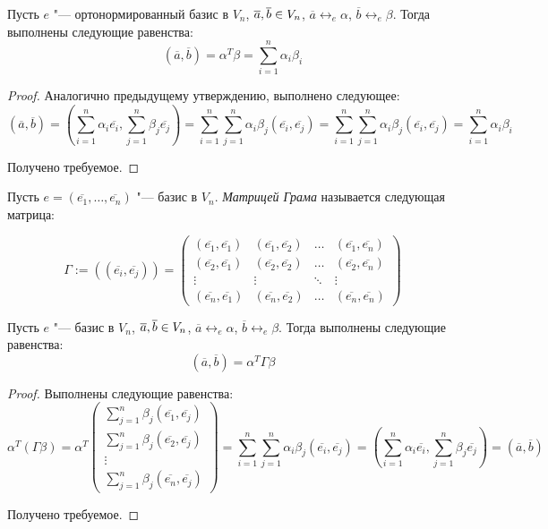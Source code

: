 \begin{proposition}
	Пусть $e$ "--- ортонормированный базис в $V_n$, $\overline{a}, \overline{b} \hm{\in} V_n$, $\overline{a} \leftrightarrow_{e} \alpha$, $\overline{b} \leftrightarrow_{e} \beta$. Тогда выполнены следующие равенства:
	\[(\overline{a}, \overline{b}) = \alpha^T\beta = \sum_{i = 1}^{n}\alpha_i\beta_i\]
\end{proposition}

\begin{proof}
	Аналогично предыдущему утверждению, выполнено следующее:
	\[(\overline{a}, \overline{b}) = \left(\sum_{i = 1}^{n}\alpha_i\overline{e_i}, \sum_{j = 1}^{n}\beta_j\overline{e_j}\right) = \sum_{i = 1}^{n}\sum_{j = 1}^{n}\alpha_i\beta_j(\overline{e_i}, \overline{e_j}) = \sum_{i = 1}^{n}\sum_{j = 1}^{n}\alpha_i\beta_j(\overline{e_i}, \overline{e_j}) = \sum_{i = 1}^{n}\alpha_i\beta_i\]
	
	Получено требуемое.
\end{proof}

\begin{definition}
	Пусть $e = (\overline{e_1}, \dots, \overline{e_n})$ "--- базис в $V_n$. \textit{Матрицей Грама} называется следующая матрица:
	
	\[\Gamma := \left((\overline{e_i}, \overline{e_j})\right) =
	\begin{pmatrix}
	(\overline{e_1}, \overline{e_1}) & (\overline{e_1}, \overline{e_2}) & \dots & (\overline{e_1}, \overline{e_n}) \\
	(\overline{e_2}, \overline{e_1}) & (\overline{e_2}, \overline{e_2}) & \dots & (\overline{e_2}, \overline{e_n}) \\
	\vdots & \vdots & \ddots & \vdots \\
	(\overline{e_n}, \overline{e_1}) & (\overline{e_n}, \overline{e_2}) & \dots & (\overline{e_n}, \overline{e_n})
	\end{pmatrix}\]
\end{definition}

\begin{proposition}
	Пусть $e$ "--- базис в $V_n$, $\overline{a}, \overline{b} \hm{\in} V_n$, $\overline{a} \leftrightarrow_{e} \alpha$, $\overline{b} \leftrightarrow_{e} \beta$. Тогда выполнены следующие равенства:
	\[(\overline{a}, \overline{b}) = \alpha^T\Gamma\beta\]
\end{proposition}

\begin{proof}
	Выполнены следующие равенства:
	\[\alpha^T(\Gamma\beta) = \alpha^T\begin{pmatrix}
	\sum_{j = 1}^{n}\beta_j(\overline{e_1}, \overline{e_j}) \\
	\sum_{j = 1}^{n}\beta_j(\overline{e_2}, \overline{e_j}) \\
	\vdots\\
	\sum_{j = 1}^{n}\beta_j(\overline{e_n}, \overline{e_j})
	\end{pmatrix} =  \sum_{i = 1}^{n}\sum_{j = 1}^{n}\alpha_i\beta_j(\overline{e_i}, \overline{e_j}) = \left(\sum_{i = 1}^{n}\alpha_i\overline{e_i}, \sum_{j = 1}^{n}\beta_j\overline{e_j}\right) = (\overline{a}, \overline{b})\]

	Получено требуемое.
\end{proof}

